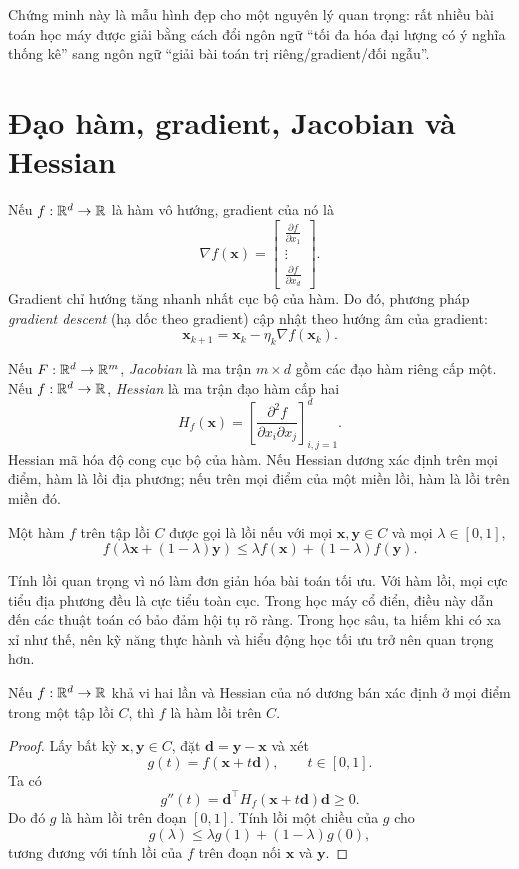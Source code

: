 Chứng minh này là mẫu hình đẹp cho một nguyên lý quan trọng: rất nhiều bài toán học máy được giải bằng cách đổi ngôn ngữ ``tối đa hóa đại lượng có ý nghĩa thống kê'' sang ngôn ngữ ``giải bài toán trị riêng/gradient/đối ngẫu''.

\section{Đạo hàm, gradient, Jacobian và Hessian}

Nếu $f:\mathbb{R}^d\to\mathbb{R}$ là hàm vô hướng, gradient của nó là
\[
\nabla f(\bm{x}) =
\begin{bmatrix}
\frac{\partial f}{\partial x_1}\\
\vdots\\
\frac{\partial f}{\partial x_d}
\end{bmatrix}.
\]
Gradient chỉ hướng tăng nhanh nhất cục bộ của hàm. Do đó, phương pháp \emph{gradient descent} (hạ dốc theo gradient) cập nhật theo hướng âm của gradient:
\[
\bm{x}_{k+1} = \bm{x}_k - \eta_k \nabla f(\bm{x}_k).
\]

Nếu $F:\mathbb{R}^d \to \mathbb{R}^m$, \emph{Jacobian} là ma trận $m\times d$ gồm các đạo hàm riêng cấp một. Nếu $f:\mathbb{R}^d\to\mathbb{R}$, \emph{Hessian} là ma trận đạo hàm cấp hai
\[
H_f(\bm{x}) =
\left[\frac{\partial^2 f}{\partial x_i \partial x_j}\right]_{i,j=1}^d.
\]
Hessian mã hóa độ cong cục bộ của hàm. Nếu Hessian dương xác định trên mọi điểm, hàm là lồi địa phương; nếu trên mọi điểm của một miền lồi, hàm là lồi trên miền đó.

\begin{definition}
Một hàm $f$ trên tập lồi $C$ được gọi là lồi nếu với mọi $\bm{x},\bm{y}\in C$ và mọi $\lambda\in[0,1]$,
\[
f(\lambda \bm{x} + (1-\lambda)\bm{y})
\le
\lambda f(\bm{x}) + (1-\lambda) f(\bm{y}).
\]
\end{definition}

Tính lồi quan trọng vì nó làm đơn giản hóa bài toán tối ưu. Với hàm lồi, mọi cực tiểu địa phương đều là cực tiểu toàn cục. Trong học máy cổ điển, điều này dẫn đến các thuật toán có bảo đảm hội tụ rõ ràng. Trong học sâu, ta hiếm khi có xa xỉ như thế, nên kỹ năng thực hành và hiểu động học tối ưu trở nên quan trọng hơn.

\begin{proposition}
Nếu $f:\mathbb{R}^d\to\mathbb{R}$ khả vi hai lần và Hessian của nó dương bán xác định ở mọi điểm trong một tập lồi $C$, thì $f$ là hàm lồi trên $C$.
\end{proposition}

\begin{proof}
Lấy bất kỳ $\bm{x},\bm{y}\in C$, đặt $\bm{d}=\bm{y}-\bm{x}$ và xét
\[
g(t)=f(\bm{x}+t\bm{d}),\qquad t\in[0,1].
\]
Ta có
\[
g''(t)=\bm{d}^\top H_f(\bm{x}+t\bm{d})\bm{d}\ge 0.
\]
Do đó $g$ là hàm lồi trên đoạn $[0,1]$. Tính lồi một chiều của $g$ cho
\[
g(\lambda)\le \lambda g(1)+(1-\lambda)g(0),
\]
tương đương với tính lồi của $f$ trên đoạn nối $\bm{x}$ và $\bm{y}$.
\end{proof}

